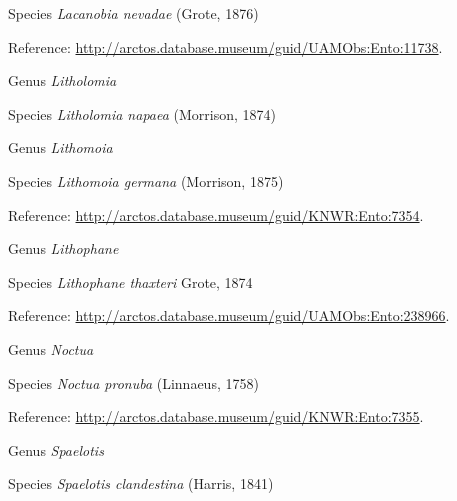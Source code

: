 \documentclass[9pt, article]{memoir}
\begin{document}
\begin{multicols}{2}
\vspace{6pt}\noindent\hspace{36pt}Species \textit{Lacanobia nevadae} (Grote, 1876)


\vspace{6pt}Reference: 
\url{http://arctos.database.museum/guid/UAMObs:Ento:11738}.

\vspace{6pt}\noindent\hspace{30pt}Genus \textit{Litholomia}


\vspace{6pt}\noindent\hspace{36pt}Species \textit{Litholomia napaea} (Morrison, 1874)


\vspace{6pt}\noindent\hspace{30pt}Genus \textit{Lithomoia}


\vspace{6pt}\noindent\hspace{36pt}Species \textit{Lithomoia germana} (Morrison, 1875)


\vspace{6pt}Reference: 
\url{http://arctos.database.museum/guid/KNWR:Ento:7354}.

\vspace{6pt}\noindent\hspace{30pt}Genus \textit{Lithophane}


\vspace{6pt}\noindent\hspace{36pt}Species \textit{Lithophane thaxteri} Grote, 1874


\vspace{6pt}Reference: 
\url{http://arctos.database.museum/guid/UAMObs:Ento:238966}.

\vspace{6pt}\noindent\hspace{30pt}Genus \textit{Noctua}


\vspace{6pt}\noindent\hspace{36pt}Species \textit{Noctua pronuba} (Linnaeus, 1758)


\vspace{6pt}Reference: 
\url{http://arctos.database.museum/guid/KNWR:Ento:7355}.

\vspace{6pt}\noindent\hspace{30pt}Genus \textit{Spaelotis}


\vspace{6pt}\noindent\hspace{36pt}Species \textit{Spaelotis clandestina} (Harris, 1841)



\end{multicols}
\end{document}
